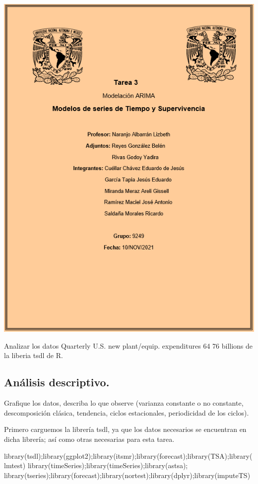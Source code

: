 \documentclass[
]{article}
\author{}
\date{\vspace{-2.5em}}
\newenvironment{Shaded}{\begin{snugshade}}{\end{snugshade}}
\newcommand{\FunctionTok}[1]{\textcolor[rgb]{0.00,0.00,0.00}{#1}}
\newcommand{\NormalTok}[1]{#1}
\begin{document}
\includegraphics[width=2\linewidth]{CARATULA}

Analizar los datos Quarterly U.S. new plant/equip. expenditures 64 76
billions de la liberia tsdl de R.

\hypertarget{anuxe1lisis-descriptivo.}{%
\subsection{Análisis descriptivo.}\label{anuxe1lisis-descriptivo.}}

Grafique los datos, describa lo que observe (varianza constante o no
constante, descomposición clásica, tendencia, ciclos estacionales,
periodicidad de los ciclos).

Primero carguemos la librería tsdl, ya que los datos necesarios se
encuentran en dicha librería; así como otras necesarias para esta tarea.

\begin{Shaded}
\begin{Highlighting}[]
\FunctionTok{library}\NormalTok{(tsdl);}\FunctionTok{library}\NormalTok{(ggplot2);}\FunctionTok{library}\NormalTok{(itsmr);}\FunctionTok{library}\NormalTok{(forecast);}\FunctionTok{library}\NormalTok{(TSA);}\FunctionTok{library}\NormalTok{(lmtest)}
\FunctionTok{library}\NormalTok{(timeSeries);}\FunctionTok{library}\NormalTok{(timeSeries);}\FunctionTok{library}\NormalTok{(astsa);}
\FunctionTok{library}\NormalTok{(tseries);}\FunctionTok{library}\NormalTok{(forecast);}\FunctionTok{library}\NormalTok{(nortest);}\FunctionTok{library}\NormalTok{(dplyr);}\FunctionTok{library}\NormalTok{(imputeTS)}
\end{Highlighting}
\end{Shaded}
\end{document}
